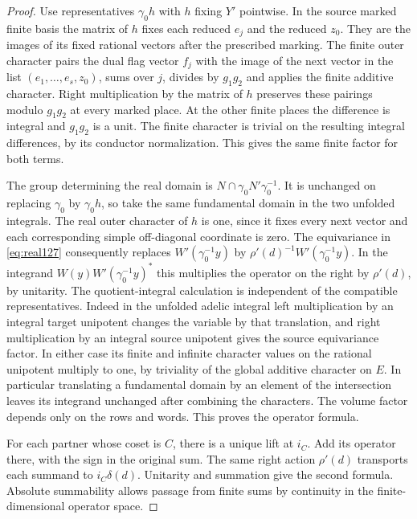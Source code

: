 \documentclass[a4paper,11pt]{article}
\theoremstyle{definition}
\theoremstyle{remark}
\numberwithin{equation}{section}
\begin{document}
\begin{proof}
Use representatives \(\gamma_0h\) with \(h\) fixing \(Y'\)
pointwise. In the source marked finite basis the matrix of \(h\)
fixes each reduced \(e_j\) and the reduced \(z_0\). They are the
images of its fixed rational vectors after the prescribed marking.
The finite outer character pairs the dual flag vector \(f_j\)
with the image of the next vector in the list
\((e_1,\ldots,e_s,z_0)\), sums over \(j\), divides by \(g_1g_2\)
and applies the finite additive character. Right multiplication by
the matrix of \(h\) preserves these pairings modulo \(g_1g_2\)
at every marked place. At the other finite places the difference
is integral and \(g_1g_2\) is a unit. The finite character is
trivial on the resulting integral differences, by its conductor
normalization. This gives the same finite factor for both terms.

The group determining the real domain is
\(N\cap\gamma_0N'\gamma_0^{-1}\). It is unchanged on replacing
\(\gamma_0\) by \(\gamma_0 h\), so take the same fundamental
domain in the two unfolded integrals. The real outer character
of \(h\) is one, since it fixes every next vector and each
corresponding simple off-diagonal coordinate is zero. The
equivariance in \eqref{eq:real127} consequently replaces
\(W'(\gamma_0^{-1}y)\) by
\(\rho'(d)^{-1}W'(\gamma_0^{-1}y)\). In the integrand
\(W(y)W'(\gamma_0^{-1}y)^*\) this multiplies the operator on
the right by \(\rho'(d)\), by unitarity. The quotient-integral
calculation is independent of the compatible representatives.
Indeed in the unfolded adelic integral left multiplication by an
integral target unipotent changes the variable by that
translation, and right multiplication by an integral source
unipotent gives the source equivariance factor. In either
case its finite and infinite character values on the rational
unipotent multiply to one, by triviality of the global additive
character on \(E\). In particular translating a fundamental
domain by an element of the intersection leaves its integrand
unchanged after combining the characters. The volume factor
depends only on the rows and words. This proves the operator
formula.

For each partner whose coset is \(C\), there is a unique lift
at \(i_C\). Add its operator there, with the sign in the original
sum. The same right action \(\rho'(d)\) transports each summand
to \(i_C\delta(d)\). Unitarity and summation give the second
formula. Absolute summability allows passage from finite sums
by continuity in the finite-dimensional operator space.
\end{proof}
\end{document}
